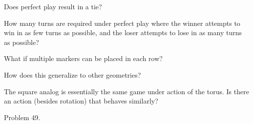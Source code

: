 \documentclass{article}
\begin{document}
  \begin{related}
    \item Does perfect play result in a tie?
    \item How many turns are required under perfect play
      where the winner attempts to win in as few turns as possible, and the
      loser attempts to lose in as many turns as possible?
    \item What if multiple markers can be placed in each row?
    \item How does this generalize to other geometries?
    \item The square analog is essentially the same game under action of the
      torus. Is there an action (besides rotation) that behaves similarly?
  \end{related}
  \begin{references}
    \item Problem 49.
  \end{references}
\end{document}
